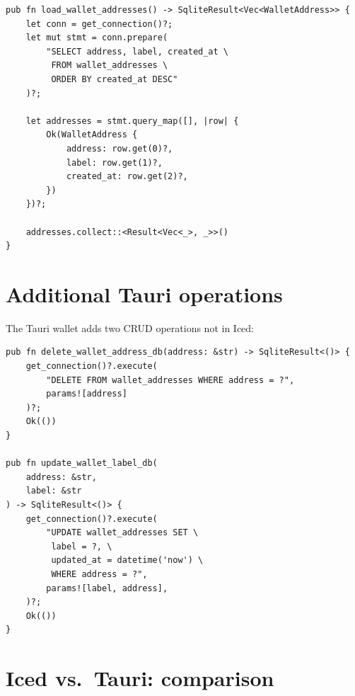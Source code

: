 \begin{listing}[H]
\caption{Loading the entire wallet list}
\label{lst:ch20-load-wallets}
\begin{verbatim}
pub fn load_wallet_addresses() -> SqliteResult<Vec<WalletAddress>> {
    let conn = get_connection()?;
    let mut stmt = conn.prepare(
        "SELECT address, label, created_at \
         FROM wallet_addresses \
         ORDER BY created_at DESC"
    )?;

    let addresses = stmt.query_map([], |row| {
        Ok(WalletAddress {
            address: row.get(0)?,
            label: row.get(1)?,
            created_at: row.get(2)?,
        })
    })?;

    addresses.collect::<Result<Vec<_>, _>>()
}
\end{verbatim}
\end{listing}

\section{Additional Tauri operations}
\label{sec:tauri-operations}

The Tauri wallet adds two CRUD operations not in Iced:

\begin{listing}[htbp]
\caption{Tauri-specific deletion and label updates}
\label{lst:ch20-tauri-ops}
\begin{verbatim}
pub fn delete_wallet_address_db(address: &str) -> SqliteResult<()> {
    get_connection()?.execute(
        "DELETE FROM wallet_addresses WHERE address = ?",
        params![address]
    )?;
    Ok(())
}

pub fn update_wallet_label_db(
    address: &str,
    label: &str
) -> SqliteResult<()> {
    get_connection()?.execute(
        "UPDATE wallet_addresses SET \
         label = ?, \
         updated_at = datetime('now') \
         WHERE address = ?",
        params![label, address],
    )?;
    Ok(())
}
\end{verbatim}
\end{listing}

\section{Iced vs.\ Tauri: comparison}
\label{sec:iced-vs-tauri}


